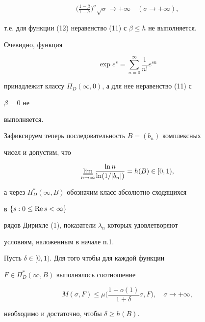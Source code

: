 \begin{pf}
\begin{multline*}
\biggl(\frac{1-\beta}{1-h} \biggr)^\sigma\sqrt{\sigma}\to 


+\infty\quad (\sigma\to+\infty), 


\end{multline*} 


т.е. для функции (12) неравенство (11) с $\beta\le h$ не выполняется. 


 


Очевидно, функция 


$$ 


\exp e^s=\sum^\infty_{n=0}\frac{1}{n!}e^{sn} 


$$ 


принадлежит классу $\Pi_D(\infty,0)$, а для нее неравенство (11) с 


$\beta=0$ не 


выполняется. 


\end{pf} 


 


Зафиксируем теперь последовательность $B=(b_n)$ комплексных 


чисел и допустим, что 


$$ 


\underset{n\to\infty}{\varliminf} 


\frac{\ln n}{\ln(1/|b_n|)}=h(B)\in[0,1), 


$$ 


а через $\Pi^*_D(\infty,B)$ обозначим класс абсолютно сходящихся 


в $\{s:0\le\operatorname{Re} s<\infty\}$ 


рядов Дирихле (1), показатели $\lambda_n$ которых удовлетворяют 


условиям, наложенным в начале п.1. 


 


\begin{thm} Пусть $\delta\in[0,1)$. Для того чтобы для каждой функции 


$F\in\Pi^*_D(\infty,B)$ выполнялось соотношение 


\begin{equation} 


M(\sigma,F)\le\mu 


\biggl(\frac{1+o(1)}{1+\delta}\sigma,F \biggr),\quad 


\sigma\to+\infty, 


\end{equation} 


необходимо и достаточно, чтобы $\delta\ge h(B)$. 


\end{thm} 



